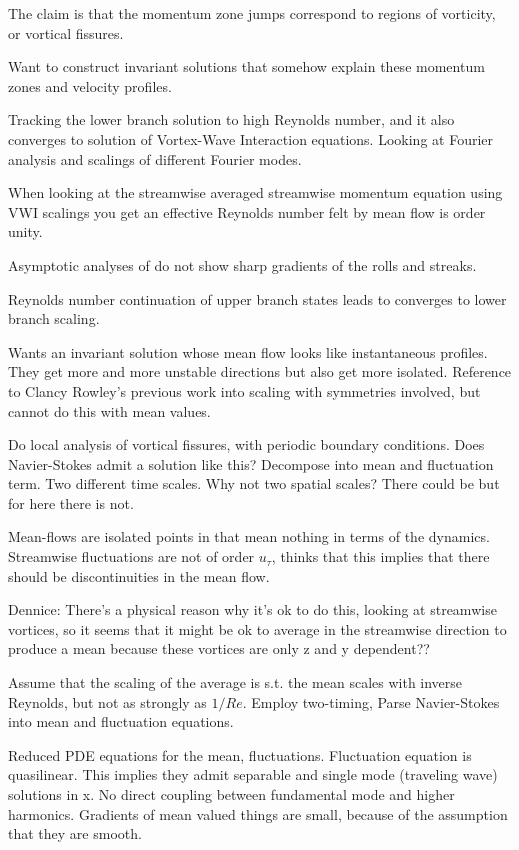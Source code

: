 \begin{description}
{\begin{description}
The claim is that the momentum zone jumps correspond to regions of vorticity, or
vortical fissures.

Want to construct invariant solutions that somehow explain these momentum zones and
velocity profiles.

Tracking the lower branch solution to high Reynolds number, and it also converges
to solution of Vortex-Wave Interaction equations. Looking at Fourier analysis
and scalings of different Fourier modes.

When looking at the streamwise averaged streamwise momentum equation using VWI
scalings you get an effective Reynolds number felt by mean flow is order unity.

Asymptotic analyses of do not show sharp gradients of the rolls and streaks.

Reynolds number continuation of upper branch states leads to converges to lower
branch scaling.

Wants an invariant solution whose mean flow looks like instantaneous profiles.
They get more and more unstable directions but also get more isolated.
Reference to Clancy Rowley's previous work into scaling with symmetries involved,
but cannot do this with mean values.

Do local analysis of vortical fissures, with periodic boundary conditions.
Does Navier-Stokes admit a solution like this? Decompose into mean and fluctuation
term. Two different time scales. Why not two spatial scales? There could be but
for here there is not.

Mean-flows are isolated points in {\statesp} that mean nothing in terms of the dynamics.
Streamwise fluctuations are not of order $u_{\tau}$, thinks that this implies that there
should be discontinuities in the mean flow.

Dennice: There's a physical reason why it's ok to do this, looking at streamwise vortices,
so it seems that it might be ok to average in the streamwise direction to produce a mean
because these vortices are only z and y dependent??

Assume that the scaling of the average is s.t. the mean scales with inverse Reynolds, but
not as strongly as $1/Re$. Employ two-timing, Parse Navier-Stokes into mean and fluctuation equations.

Reduced PDE equations for the mean, fluctuations. Fluctuation equation is quasilinear.
This implies they admit separable and single mode (traveling wave) solutions in x. No direct
coupling between fundamental mode and higher harmonics.
Gradients of mean valued things are small, because of the assumption that they are smooth.


\end{description}}
\end{description}
